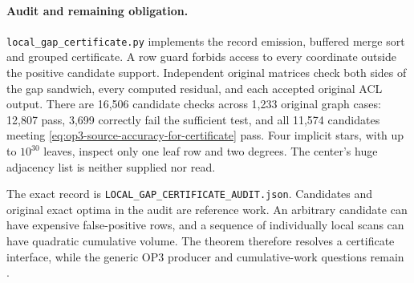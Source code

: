 \paragraph{Audit and remaining obligation.}
\texttt{local\_gap\_certificate.py} implements the record emission,
buffered merge sort and grouped certificate. A row guard forbids access to
every coordinate outside the positive candidate support. Independent
original matrices check both sides of the gap sandwich, every computed
residual, and each accepted original ACL output. There are 16,506 candidate
checks across 1,233 original graph cases: 12,807 pass, 3,699 correctly
fail the sufficient test, and all 11,574 candidates meeting
\cref{eq:op3-source-accuracy-for-certificate} pass. Four implicit stars,
with up to $10^{30}$ leaves, inspect only one leaf row and two degrees.
The center's huge adjacency list is neither supplied nor read.

The exact record is \texttt{LOCAL\_GAP\_CERTIFICATE\_AUDIT.json}.
Candidates and original exact optima in the audit are reference work.
An arbitrary candidate can have expensive false-positive rows, and a
sequence of individually local scans can have quadratic cumulative volume.
The theorem therefore resolves a certificate interface, while the generic
OP3 producer and cumulative-work questions remain \statusopen.
